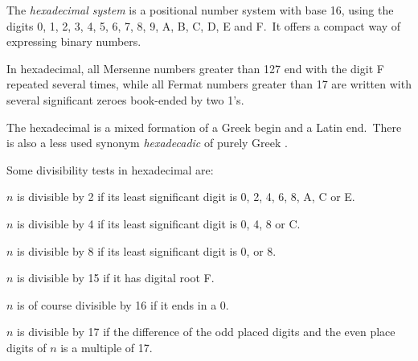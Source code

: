 \documentclass[12pt]{article}
\begin{document}
The {\em hexadecimal system} is a positional number system with base 16, using the digits 0, 1, 2, 3, 4, 5, 6, 7, 8, 9, A, B, C, D, E and F.\, It offers a compact way of expressing binary numbers.

In hexadecimal, all Mersenne numbers greater than 127 end with the digit F repeated several times, while all Fermat numbers greater than 17 are written with several significant zeroes book-ended by two 1's.

The  hexadecimal is a mixed formation of a Greek begin and a Latin end.\, There is also a less used synonym {\em hexadecadic} of purely Greek .

Some divisibility tests in hexadecimal are:

$n$ is divisible by 2 if its least significant digit is 0, 2, 4, 6, 8, A, C or E.

$n$ is divisible by 4 if its least significant digit is 0, 4, 8 or C.

$n$ is divisible by 8 if its least significant digit is 0, or 8.

$n$ is divisible by 15 if it has digital root F.

$n$ is of course divisible by 16 if it ends in a 0.

$n$ is divisible by 17 if the difference of the odd placed digits and the even place digits of $n$ is a multiple of 17.
\end{document}
